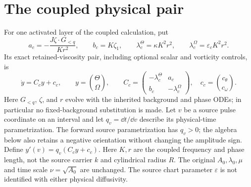 \section{The coupled physical pair}
For one activated layer of the coupled calculation, put
\begin{equation}
 a_c=-\frac{J\zeta\cdot G_{<q}}{Kr^2},\qquad b_c=K\zeta_1,\qquad
 \lambda_c^\Theta=\kappa K^2r^2,\qquad \lambda_c^\Omega=\varepsilon_c K^2r^2.
\end{equation}
Its exact retained-viscosity pair, including optional scalar and vorticity
controls, is
\begin{equation}
 \dot y=C_cy+c_c,\qquad y=\binom{\Theta}{\Omega},\qquad
 C_c=\begin{pmatrix}-\lambda_c^\Theta&a_c\\b_c&-\lambda_c^\Omega\end{pmatrix},\quad
 c_c=\binom{c_\theta}{c_\omega}.
 \label{eq:coupledpair}
\end{equation}
Here $G_{<q}$, $\zeta$, and $r$ evolve with the inherited background and phase
ODEs; in particular no fixed-background substitution is made.  Let $v$ be a
source pulse coordinate on an interval and let $q_v=\dd t/\dd v$ describe
its physical-time parametrization. The forward source parametrization has
$q_v>0$; the algebra below also retains a negative orientation without
changing the amplitude sign. Define $y'(v)=q_v(C_cy+c_c)$.
Here $K,r$ are the coupled frequency and phase length, not the source
carrier $k$ and cylindrical radius $R$. The original $A_0,\lambda_0,\mu$
and time scale $\nu=\sqrt{A_0}$ are unchanged. The source chart parameter
$\varepsilon$ is not identified with either physical diffusivity.

